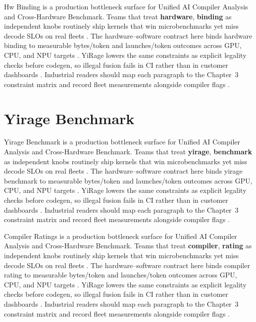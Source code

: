 Hw Binding is a production bottleneck surface for Unified AI Compiler Analysis and Cross-Hardware Benchmark. Teams that treat \textbf{hardware}, \textbf{binding} as independent knobs routinely ship kernels that win microbenchmarks yet miss decode SLOs on real fleets \citep{nvidia2022hopper,amd2024aie}. The hardware--software contract here binds hardware binding to measurable bytes/token and launches/token outcomes across GPU, CPU, and NPU targets \citep{semianalysis2024tma,dlbook}. YiRage lowers the same constraints as explicit legality checks before codegen, so illegal fusion fails in CI rather than in customer dashboards \citep{amd2024xdna,dao2022flashattention}. Industrial readers should map each paragraph to the Chapter~3 constraint matrix and record fleet measurements alongside compiler flags \citep{amd2024aie,kwon2023vllm}.

\section{Yirage Benchmark}
\label{sec:yirage_benchmark}

Yirage Benchmark is a production bottleneck surface for Unified AI Compiler Analysis and Cross-Hardware Benchmark. Teams that treat \textbf{yirage}, \textbf{benchmark} as independent knobs routinely ship kernels that win microbenchmarks yet miss decode SLOs on real fleets \citep{semianalysis2024tma,dlbook}. The hardware--software contract here binds yirage benchmark to measurable bytes/token and launches/token outcomes across GPU, CPU, and NPU targets \citep{amd2024xdna,dao2022flashattention}. YiRage lowers the same constraints as explicit legality checks before codegen, so illegal fusion fails in CI rather than in customer dashboards \citep{amd2024aie,kwon2023vllm}. Industrial readers should map each paragraph to the Chapter~3 constraint matrix and record fleet measurements alongside compiler flags \citep{dlbook,nvidia2024cudagraphs}.

Compiler Ratings is a production bottleneck surface for Unified AI Compiler Analysis and Cross-Hardware Benchmark. Teams that treat \textbf{compiler}, \textbf{rating} as independent knobs routinely ship kernels that win microbenchmarks yet miss decode SLOs on real fleets \citep{memoryfloor2026,amd2024xdna}. The hardware--software contract here binds compiler rating to measurable bytes/token and launches/token outcomes across GPU, CPU, and NPU targets \citep{nvidia2022hopper,amd2024aie}. YiRage lowers the same constraints as explicit legality checks before codegen, so illegal fusion fails in CI rather than in customer dashboards \citep{semianalysis2024tma,dlbook}. Industrial readers should map each paragraph to the Chapter~3 constraint matrix and record fleet measurements alongside compiler flags \citep{amd2024xdna,dao2022flashattention}.

